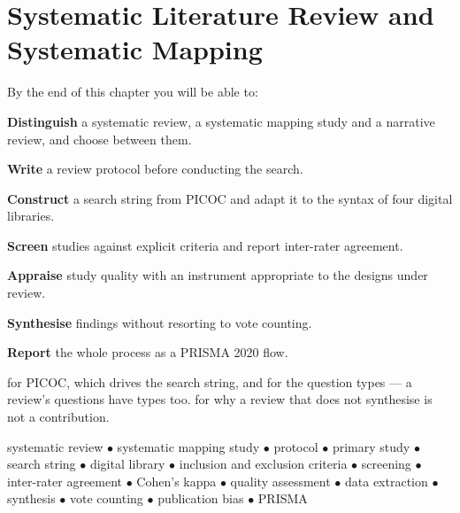 \chapter{Systematic Literature Review and Systematic Mapping}\label{ch:slr}

\begin{outcomes}
By the end of this chapter you will be able to:
\begin{tight}
  \item \textbf{Distinguish} a systematic review, a systematic mapping study
    and a narrative review, and choose between them.
  \item \textbf{Write} a review protocol before conducting the search.
  \item \textbf{Construct} a search string from PICOC and adapt it to the
    syntax of four digital libraries.
  \item \textbf{Screen} studies against explicit criteria and report inter-rater
    agreement.
  \item \textbf{Appraise} study quality with an instrument appropriate to the
    designs under review.
  \item \textbf{Synthesise} findings without resorting to vote counting.
  \item \textbf{Report} the whole process as a PRISMA 2020 flow.
\end{tight}
\end{outcomes}

\begin{prereq}
 for PICOC, which drives the search string, and for the
question types --- a review's questions have types too. 
for why a review that does not synthesise is not a contribution.
\end{prereq}

\begin{keyterms}
systematic review $\bullet$ systematic mapping study $\bullet$ protocol
$\bullet$ primary study $\bullet$ search string $\bullet$ digital library
$\bullet$ inclusion and exclusion criteria $\bullet$ screening $\bullet$
inter-rater agreement $\bullet$ Cohen's kappa $\bullet$ quality assessment
$\bullet$ data extraction $\bullet$ synthesis $\bullet$ vote counting
$\bullet$ publication bias $\bullet$ PRISMA
\end{keyterms}

